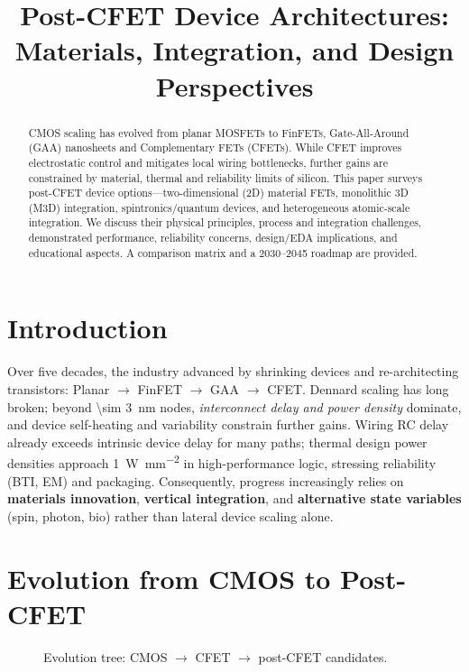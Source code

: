 \documentclass[conference]{IEEEtran}
\title{Post-CFET Device Architectures: Materials, Integration, and Design Perspectives}
\author{
\IEEEauthorblockN{Shinichi Samizo}
\IEEEauthorblockA{Independent Semiconductor Researcher\\
Project Design Hub, Samizo-AITL\\
\textit{Email:} \href{mailto:shin3t72@gmail.com}{shin3t72@gmail.com}\quad
\textit{GitHub:} \href{https://github.com/Samizo-AITL}{Samizo-AITL}}
}
\newcommand{\figpath}{figures}
\newcommand{\tikzcol}[2][\linewidth]{\resizebox{#1}{!}{}}
\begin{document}
\maketitle

\begin{abstract}
CMOS scaling has evolved from planar MOSFETs to FinFETs, Gate-All-Around (GAA) nanosheets and Complementary FETs (CFETs).
While CFET improves electrostatic control and mitigates local wiring bottlenecks, further gains are constrained by material, thermal and reliability limits of silicon.
This paper surveys post-CFET device options---two-dimensional (2D) material FETs, monolithic 3D (M3D) integration, spintronics/quantum devices, and heterogeneous atomic-scale integration.
We discuss their physical principles, process and integration challenges, demonstrated performance, reliability concerns, design/EDA implications, and educational aspects.
A comparison matrix and a 2030--2045 roadmap are provided.
\end{abstract}

\FloatBarrier %

\section{Introduction}
Over five decades, the industry advanced by shrinking devices and re-architecting transistors: Planar $\rightarrow$ FinFET $\rightarrow$ GAA $\rightarrow$ CFET.
Dennard scaling has long broken; beyond \SI{\sim 3}{\nano\meter} nodes, \emph{interconnect delay and power density} dominate, and device self-heating and variability constrain further gains.
Wiring RC delay already exceeds intrinsic device delay for many paths; thermal design power densities approach \SI{1}{\watt\per\square\milli\meter} in high-performance logic, stressing reliability (BTI, EM) and packaging.
Consequently, progress increasingly relies on \textbf{materials innovation}, \textbf{vertical integration}, and \textbf{alternative state variables} (spin, photon, bio) rather than lateral device scaling alone.

\section{Evolution from CMOS to Post-CFET}
\begin{figure*}[!t]
  \centering
  \tikzcol[0.9\textwidth]{\figpath/evolution_tree.tex}
  \caption{Evolution tree: CMOS $\rightarrow$ CFET $\rightarrow$ post-CFET candidates.}
  \label{fig:evolution}
\end{figure*}
\end{document}
